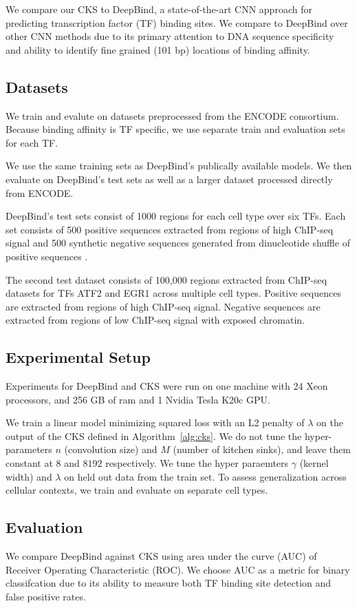 \documentclass{article}
\begin{document}
We compare our CKS to DeepBind, a state-of-the-art CNN approach for predicting transcription factor (TF) binding sites. We compare to DeepBind over other CNN methods \cite{zhou2015predicting, kelley2016basset} due to its primary attention to DNA sequence specificity and ability to identify fine grained (101 bp) locations of binding affinity.

\subsection{Datasets}
We train and evalute on datasets preprocessed from the ENCODE consortium.
Because binding affinity is TF specific, we use separate train and evaluation sets for each TF.

We use the same training sets as DeepBind's publically available models. We then evaluate on DeepBind's
test sets as well as a larger dataset processed directly from ENCODE.

DeepBind's test sets consist of 1000 regions for each cell type over six TFs. Each set consists of
500 positive sequences extracted from regions of high ChIP-seq signal and 500 synthetic negative sequences generated from dinucleotide shuffle of positive sequences \cite{alipanahi2015predicting}.

The second test dataset consists of 100,000 regions extracted from ChIP-seq datasets for TFs ATF2 and EGR1 across multiple cell types. Positive sequences are extracted from regions of high ChIP-seq signal.
Negative sequences are extracted from regions of low ChIP-seq signal with exposed chromatin.

\subsection{Experimental Setup}
Experiments for DeepBind and CKS were run on one machine with 24 Xeon processors, and 256 GB of ram and 1 Nvidia Tesla K20c GPU.

We train a linear model minimizing squared loss with an L2 penalty of $\lambda$ on the output of the CKS defined in Algorithm~\ref{alg:cks}.
We do not tune the hyper-parameters $n$ (convolution size)
and $M$ (number of kitchen sinks), and leave them constant at $8$ and $8192$ respectively.
We tune the hyper paraemters $\gamma$ (kernel width) and $\lambda$ on held out data from the train set.
To assess generalization across cellular contexts, we train and evaluate on separate cell types.

\subsection{Evaluation}
We compare DeepBind against CKS using area under the curve (AUC) of Receiver Operating Characteristic (ROC).
We choose AUC as a metric for binary classifcation due to its ability to measure both TF binding site detection and false positive rates.
\end{document}
